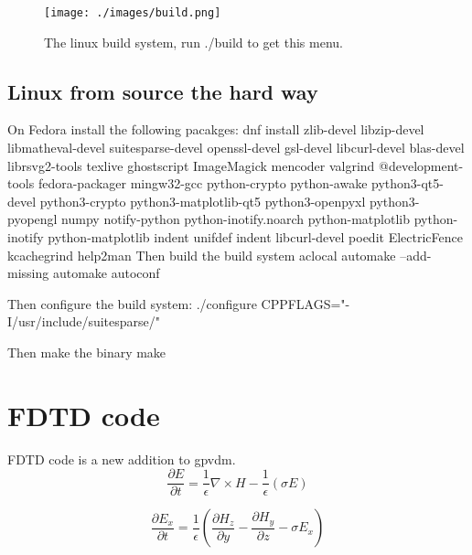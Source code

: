 \documentclass[11pt]{article}
\begin{document}
\begin{figure}[ht!]
\centering
\texttt{[image: ./images/build.png]}
\caption{The linux build system, run ./build to get this menu.  }
\label{fig:build}
\end{figure}


\subsection{Linux from source the hard way}

On Fedora install the following pacakges:\newline
dnf install zlib-devel libzip-devel libmatheval-devel suitesparse-devel openssl-devel gsl-devel libcurl-devel blas-devel librsvg2-tools texlive ghostscript ImageMagick mencoder valgrind @development-tools fedora-packager mingw32-gcc python-crypto python-awake python3-qt5-devel python3-crypto python3-matplotlib-qt5 python3-openpyxl python3-pyopengl numpy notify-python python-inotify.noarch python-matplotlib python-inotify python-matplotlib indent unifdef indent libcurl-devel poedit ElectricFence kcachegrind help2man\newline
\newline
Then build the build system\newline
aclocal\newline
automake --add-missing\newline
automake\newline
autoconf\newline

Then configure the build system:\newline
./configure CPPFLAGS="-I/usr/include/suitesparse/"\newline

Then make the binary\newline
make\newline

\newpage

\section{FDTD code}
FDTD code is a new addition to gpvdm.
\begin{equation}
\frac{\partial E}{\partial t}= \frac{1}{\epsilon} \nabla \times H - \frac{1}{\epsilon} (\sigma E) 
\end{equation}


\begin{equation}
\frac{\partial E_x}{\partial t}= \frac{1}{\epsilon}(\frac{\partial H_z}{\partial y}-\frac{\partial H_y}{\partial z}-\sigma E_x) 
\end{equation}
\end{document}
